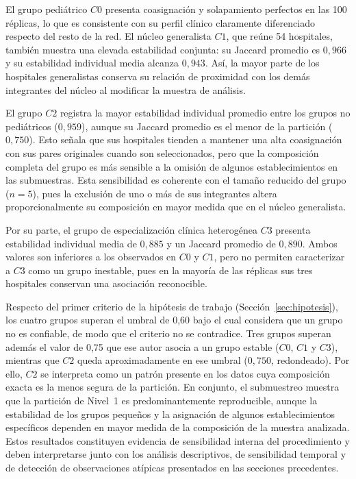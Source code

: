 El grupo pediátrico $C0$ presenta coasignación y solapamiento perfectos en las 100 réplicas, lo que es consistente con su perfil clínico claramente diferenciado respecto del resto de la red. El núcleo generalista $C1$, que reúne 54 hospitales, también muestra una elevada estabilidad conjunta: su Jaccard promedio es $0{,}966$ y su estabilidad individual media alcanza $0{,}943$. Así, la mayor parte de los hospitales generalistas conserva su relación de proximidad con los demás integrantes del núcleo al modificar la muestra de análisis.

El grupo $C2$ registra la mayor estabilidad individual promedio entre los grupos no pediátricos ($0{,}959$), aunque su Jaccard promedio es el menor de la partición ($0{,}750$). Esto señala que sus hospitales tienden a mantener una alta coasignación con sus pares originales cuando son seleccionados, pero que la composición completa del grupo es más sensible a la omisión de algunos establecimientos en las submuestras. Esta sensibilidad es coherente con el tamaño reducido del grupo ($n=5$), pues la exclusión de uno o más de sus integrantes altera proporcionalmente su composición en mayor medida que en el núcleo generalista.

Por su parte, el grupo de especialización clínica heterogénea $C3$ presenta estabilidad individual media de $0{,}885$ y un Jaccard promedio de $0{,}890$. Ambos valores son inferiores a los observados en $C0$ y $C1$, pero no permiten caracterizar a $C3$ como un grupo inestable, pues en la mayoría de
las réplicas sus tres hospitales conservan una asociación reconocible.

Respecto del primer criterio de la hipótesis de trabajo (Sección~\ref{sec:hipotesis}), los cuatro grupos superan el umbral de 0,60 bajo el cual \citet{Hennig2007} considera que un grupo no es confiable, de modo que el criterio no se contradice. Tres grupos superan además el valor de 0,75 que ese autor asocia a un grupo estable ($C0$, $C1$ y $C3$), mientras que $C2$ queda aproximadamente en ese umbral ($0{,}750$, redondeado). Por ello, $C2$ se interpreta como un patrón presente en los datos cuya composición exacta es la menos segura de la partición. En conjunto, el submuestreo muestra que la partición de Nivel~1 es predominantemente reproducible, aunque la estabilidad de los grupos pequeños y la asignación de algunos establecimientos específicos dependen en mayor medida de la composición de la muestra analizada. Estos resultados constituyen evidencia de sensibilidad interna del procedimiento y deben interpretarse junto con los análisis descriptivos, de sensibilidad temporal y de detección de observaciones atípicas presentados en las secciones precedentes.


